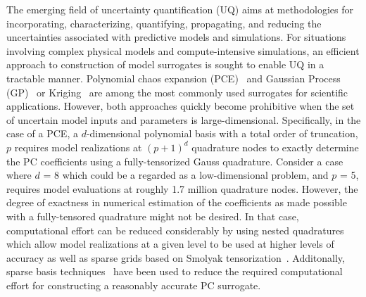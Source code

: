 The emerging field of uncertainty quantification (UQ) aims at methodologies for 
incorporating, characterizing, quantifying, propagating, and reducing the 
uncertainties associated with predictive models and simulations. For situations
involving complex physical models and compute-intensive simulations, an
efficient approach to construction of model surrogates is sought to enable UQ
in a tractable manner. Polynomial chaos expansion 
(PCE)~\cite{Xiu:2002,Ghanem:2003,Eldred:2008,Olivier:2010} and 
Gaussian Process (GP)~\cite{Rasmussen:2004} or Kriging~\cite{Stein:2012} are
among the most commonly used surrogates for scientific applications. However,
both approaches quickly become prohibitive when the set of uncertain model
inputs and parameters is large-dimensional. Specifically, in the case of a PCE,
a $d$-dimensional polynomial basis with a total order of truncation, $p$ 
requires model realizations at $(p+1)^d$ quadrature nodes to exactly determine the PC
coefficients using a fully-tensorized Gauss quadrature. Consider a case where $d$ = 8 which
could be a regarded as a low-dimensional problem, and $p$ = 5, requires model evaluations at
roughly 1.7 million quadrature nodes. However, the degree of exactness in numerical estimation 
of the coefficients as made possible with a fully-tensored quadrature might not be desired. In that
case, computational effort can be reduced considerably by using nested
quadratures~\cite{Gentleman:1972a,Gentleman:1972b,Novak:1999,Waldvogel:2006} which allow 
model realizations at a given level to be used at higher levels of accuracy as well as sparse grids
based on Smolyak tensorization~\cite{Smolyak:1963}. Additonally, sparse basis 
techniques~\cite{Peng:2014,Hampton:2015,Blatman:2011} have been used to reduce  the required
computational effort for constructing a reasonably accurate PC surrogate. 

